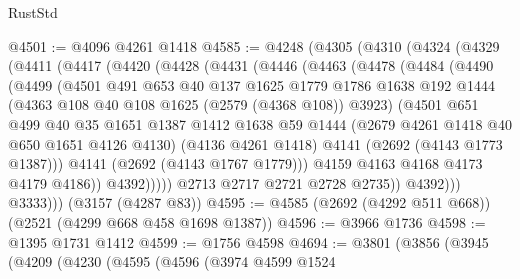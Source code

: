 \begin{lexlean}{RustStd}
\begin{coremodule}
{\begin{coremodule}
{{{{{{{{{{@4501 := @4096 @4261 @1418
@4585 := @4248
    (@4305
      (@4310
        (@4324
          (@4329
            (@4411
              (@4417
                (@4420
                  (@4428
                    (@4431
                      (@4446
                        (@4463
                          (@4478
                            (@4484
                              (@4490
                                (@4499
                                  (@4501
                                    @491
                                    @653
                                    @40
                                    @137
                                    @1625
                                    @1779
                                    @1786
                                    @1638
                                    @192
                                    @1444
                                    (@4363 @108 @40 @108 @1625 (@2579 (@4368 @108)) @3923)
                                    (@4501
                                      @651
                                      @499
                                      @40
                                      @35
                                      @1651
                                      @1387
                                      @1412
                                      @1638
                                      @59
                                      @1444
                                      (@2679 @4261 @1418 @40 @650 @1651 @4126 @4130)
                                      (@4136 @4261 @1418)
                                      @4141
                                      (@2692 (@4143 @1773 @1387)))
                                    @4141
                                    (@2692 (@4143 @1767 @1779)))
                                  @4159
                                  @4163
                                  @4168
                                  @4173
                                  @4179
                                  @4186))
                              @4392)))))
                    @2713
                    @2717
                    @2721
                    @2728
                    @2735))
                @4392)))
          @3333)))
    (@3157 (@4287 @83))
@4595 := @4585 (@2692 (@4292 @511 @668)) (@2521 (@4299 @668 @458 @1698 @1387))
@4596 := @3966 @1736
@4598 := @1395 @1731 @1412
@4599 := @1756 @4598
@4694 := @3801
    (@3856
      (@3945
        (@4209
          (@4230
            (@4595
              (@4596
                (@3974
                  @4599
                  @1524
}}}}}}}}}}
\end{coremodule}}
\end{coremodule}
\end{lexlean}
